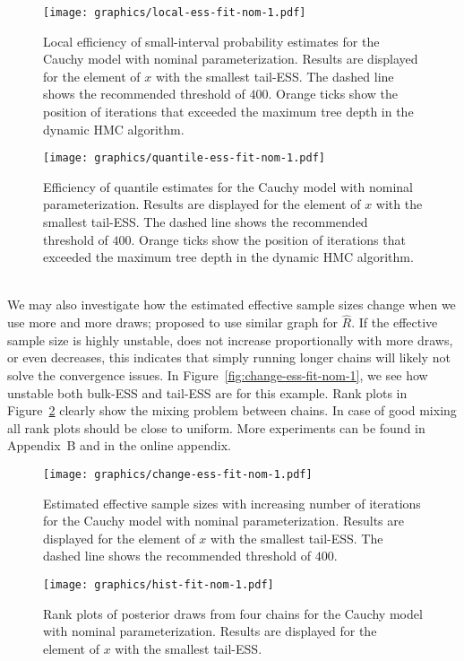 \documentclass[american,]{article}
\theoremstyle{definition}
\begin{document}
\begin{figure}[tp]
  \centering
  \begin{minipage}{0.48\textwidth}
  \texttt{[image: graphics/local-ess-fit-nom-1.pdf]}
  \caption{Local efficiency of small-interval probability
    estimates for the Cauchy model with nominal parameterization. 
    Results are displayed for the element of $x$ with the smallest tail-ESS. The dashed line shows the
    recommended threshold of $400$.
    Orange ticks show the position of iterations that exceeded the maximum 
    tree depth in the dynamic HMC algorithm.}
\label{fig:local-ess-fit-nom-1}
\end{minipage}
\hfill
  \begin{minipage}{0.48\textwidth}
  \texttt{[image: graphics/quantile-ess-fit-nom-1.pdf]}
  \caption{Efficiency of quantile estimates for the Cauchy model with nominal 
  parameterization. Results are displayed for the element of $x$ with the 
  smallest tail-ESS. The dashed line shows the
    recommended threshold of $400$. Orange ticks show the position of iterations that 
  exceeded the maximum tree depth in the dynamic HMC algorithm.\\~}
  \label{fig:quantile-ess-fit-nom-1}
\end{minipage}
\end{figure}

We may also investigate how the estimated effective sample sizes
change when we use more and more draws; \citet{Brooks+Gelman:1998}
proposed to use similar graph for \(\widehat{R}\). If the effective
sample size is highly unstable, does not increase proportionally with
more draws, or even decreases, this indicates that simply running
longer chains will likely not solve the convergence issues. In
Figure~\ref{fig:change-ess-fit-nom-1}, we see how unstable both
bulk-ESS and tail-ESS are for this example.
%
Rank plots in Figure~\ref{fig:hist-fit-nom-1} clearly show the
mixing problem between chains. In case of good mixing all rank plots
should be close to uniform. More experiments can be found in Appendix~B 
and in the online appendix.

\begin{figure}[tp]
  \centering
  \begin{minipage}{0.48\textwidth}
  \texttt{[image: graphics/change-ess-fit-nom-1.pdf]}
  \caption{Estimated effective sample sizes with increasing number of iterations
  for the Cauchy model with nominal parameterization. Results are displayed 
  for the element of $x$ with the smallest tail-ESS. The dashed line shows the
    recommended threshold of $400$.}
  \label{fig:change-ess-fit-nom-1}
\end{minipage}
\hfill
\begin{minipage}{0.48\textwidth}
  \texttt{[image: graphics/hist-fit-nom-1.pdf]}
  \caption{Rank plots of posterior draws from four chains for the Cauchy model 
  with nominal parameterization. Results are displayed for the element of 
  $x$ with the smallest tail-ESS.}
  \label{fig:hist-fit-nom-1}
\end{minipage}
\end{figure}
\end{document}
